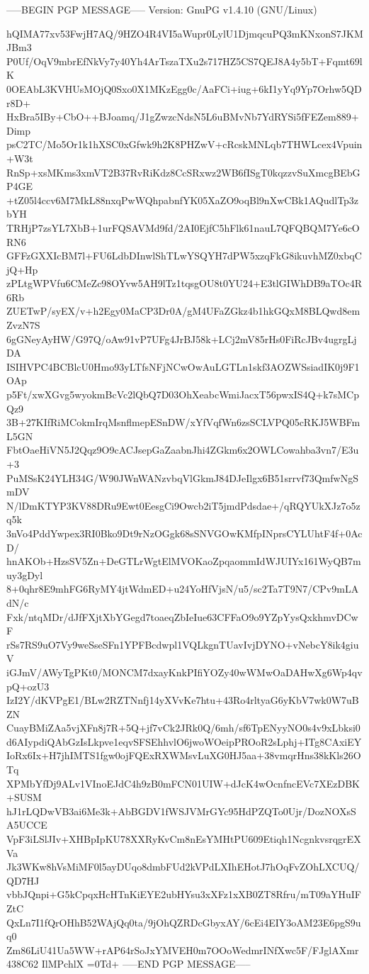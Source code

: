 -----BEGIN PGP MESSAGE-----
Version: GnuPG v1.4.10 (GNU/Linux)

hQIMA77xv53FwjH7AQ/9HZO4R4VI5aWupr0LylU1DjmqcuPQ3mKNxonS7JKMJBm3
P0Uf/OqV9mbrEfNkVy7y40Yh4ArTszaTXu2s717HZ5CS7QEJ8A4y5bT+Fqmt69lK
0OEAbL3KVHUsMOjQ0Sxo0X1MKzEgg0c/AaFCi+iug+6kI1yYq9Yp7Orhw5QDr8D+
HxBra5IBy+CbO++BJoamq/J1gZwzcNdsN5L6uBMvNb7YdRYSi5fFEZem889+Dimp
psC2TC/Mo5Or1k1hXSC0xGfwk9h2K8PHZwV+cRcskMNLqb7THWLcex4Vpuin+W3t
RnSp+xsMKms3xmVT2B37RvRiKdz8CcSRxwz2WB6fISgT0kqzzvSuXmcgBEbGP4GE
+tZ05l4ccv6M7MkL88nxqPwWQhpabnfYK05XaZO9oqBl9nXwCBk1AQudlTp3zbYH
TRHjP7zsYL7XbB+1urFQSAVMd9fd/2AI0EjfC5hFlk61nauL7QFQBQM7Ye6cORN6
GFFzGXXIcBM7l+FU6LdbDInwlShTLwYSQYH7dPW5xzqFkG8ikuvhMZ0xbqCjQ+Hp
zPLtgWPVfu6CMeZc98OYvw5AH9lTz1tqsgOU8t0YU24+E3tlGIWhDB9aTOc4R6Rb
ZUETwP/syEX/v+h2Egy0MaCP3Dr0A/gM4UFaZGkz4b1hkGQxM8BLQwd8emZvzN7S
6gGNeyAyHW/G97Q/oAw91vP7UFg4JrBJ58k+LCj2mV85rHs0FiRcJBv4ugrgLjDA
ISIHVPC4BCBlcU0Hmo93yLTfsNFjNCwOwAuLGTLn1skf3AOZWSsiadIK0j9F1OAp
p5Ft/xwXGvg5wyokmBcVc2lQbQ7D03OhXeabcWmiJacxT56pwxIS4Q+k7sMCpQz9
3B+27KIfRiMCokmIrqMsnflmepESnDW/xYfVqfWn6zsSCLVPQ05cRKJ5WBFmL5GN
FbtOaeHiVN5J2Qqz9O9cACJsepGaZaabnJhi4ZGkm6x2OWLCowahba3vn7/E3u+3
PuMSsK24YLH34G/W90JWnWANzvbqVlGkmJ84DJeIlgx6B51srrvf73QmfwNgSmDV
N/lDmKTYP3KV88DRu9Ewt0EesgCi9Owcb2iT5jmdPdsdae+/qRQYUkXJz7o5zq5k
3nVo4PddYwpex3RI0Bko9Dt9rNzOGgk68sSNVGOwKMfpINprsCYLUhtF4f+0AcD/
hnAKOb+HzsSV5Zn+DeGTLrWgtElMVOKaoZpqaommIdWJUIYx161WyQB7muy3gDyl
8+0qhr8E9mhFG6RyMY4jtWdmED+u24YoHfVjsN/u5/sc2Ta7T9N7/CPv9mLAdN/c
Fxk/ntqMDr/dJfFXjtXbYGegd7toaeqZbIeIue63CFFaO9o9YZpYysQxkhmvDCwF
rSs7RS9uO7Vy9weSseSFn1YPFBcdwpl1VQLkgnTUavIvjDYNO+vNebcY8ik4giuV
iGJmV/AWyTgPKt0/MONCM7dxayKnkPIfiYOZy40wWMwOaDAHwXg6Wp4qvpQ+ozU3
IzI2Y/dKVPgE1/BLw2RZTNnfj14yXVvKe7htu+43Ro4rltyaG6yKbV7wk0W7uBZN
CuayBMiZAa5vjXFn8j7R+5Q+jf7vCk2JRk0Q/6mh/sf6TpENyyNO0s4v9xLbksi0
d6AIypdiQAbGzIsLkpve1eqvSFSEhhvlO6jwoWOeipPROoR2sLphj+ITg8CAxiEY
IoRx6Ix+H7jhIMTS1fgw0ojFQExRXWMsvLuXG0HJ5aa+38vmqrHns38kKls26OTq
XPMbYfDj9ALv1VInoEJdC4h9zB0mFCN01UIW+dJcK4wOcnfncEVc7XEzDBK+SUSM
hJ1rLQDwVB3ai6Me3k+AbBGDV1fWSJVMrGYc95HdPZQTo0Ujr/DozNOXsSA5UCCE
VpF3iLSlJIv+XHBpIpKU78XXRyKvCm8nEsYMHtPU609Etiqh1NcgnkvsrqgrEXVa
Jk3WKw8hVsMiMF0l5ayDUqo8dmbFUd2kVPdLXIhEHotJ7hOqFvZOhLXCUQ/QD7HJ
vbbJQnpi+G5kCpqxHcHTnKiEYE2ubHYsu3xXFz1xXB0ZT8Rfru/mT09aYHuIFZtC
QxLn7I1fQrOHhB52WAjQq0ta/9jOhQZRDcGbyxAY/6cEi4EIY3oAM23E6pgS9uq0
Zm86LiU41Ua5WW+rAP64rSoJxYMVEH0m7OOoWedmrINfXwc5F/FJglAXmr438C62
IlMPchlX
=0Td+
-----END PGP MESSAGE-----
